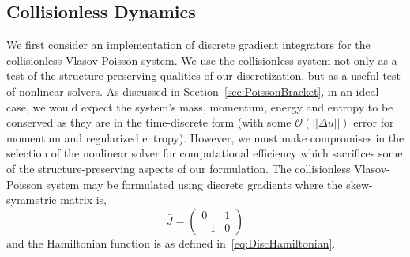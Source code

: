 \documentclass[preprint,12pt]{elsarticle}
\theoremstyle{definition}
\begin{document}
\subsection{Collisionless Dynamics}\label{sec:collisionless}
We first consider an implementation of discrete gradient integrators for the collisionless Vlasov-Poisson system. We use the collisionless system not only as a test of the structure-preserving qualities of our discretization, but as a useful test of nonlinear solvers. As discussed in Section~\ref{sec:PoissonBracket}, in an ideal case, we would expect the system's mass, momentum, energy and entropy to be conserved as they are in the time-discrete form (with some $\mathcal{O}(||\Delta u||)$ error for momentum and regularized entropy). However, we must make compromises in the selection of the nonlinear solver for computational efficiency which sacrifices some of the structure-preserving aspects of our formulation.
The collisionless Vlasov-Poisson system may be formulated using discrete gradients where the skew-symmetric matrix is,
\begin{equation}
\bar{J} = \begin{pmatrix} 0 & 1 \\ -1 & 0\end{pmatrix}
\end{equation}
and the Hamiltonian function is as defined in~\eqref{eq:DiscHamiltonian}.
\end{document}
